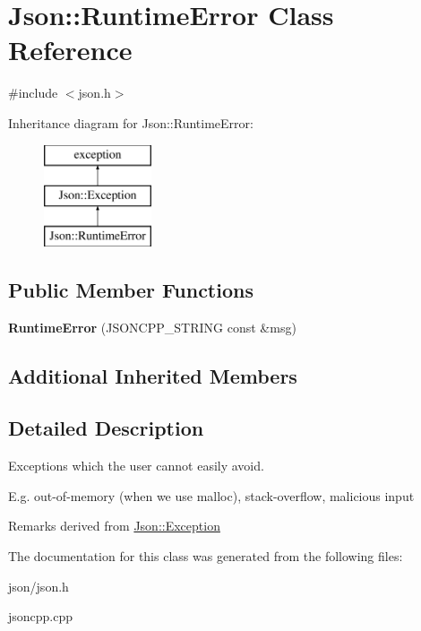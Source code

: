 \hypertarget{classJson_1_1RuntimeError}{}\section{Json\+:\+:Runtime\+Error Class Reference}
\label{classJson_1_1RuntimeError}


{\ttfamily \#include $<$json.\+h$>$}

Inheritance diagram for Json\+:\+:Runtime\+Error\+:\begin{figure}[H]
\begin{center}
\leavevmode
\includegraphics[height=3.000000cm]{classJson_1_1RuntimeError}
\end{center}
\end{figure}
\subsection*{Public Member Functions}
\begin{DoxyCompactItemize}
\item 
\mbox{\label{classJson_1_1RuntimeError_a0f6445dc345ce0a703610b6e893fee40}} 
{\bfseries Runtime\+Error} (J\+S\+O\+N\+C\+P\+P\+\_\+\+S\+T\+R\+I\+NG const \&msg)
\end{DoxyCompactItemize}
\subsection*{Additional Inherited Members}


\subsection{Detailed Description}
Exceptions which the user cannot easily avoid.

E.\+g. out-\/of-\/memory (when we use malloc), stack-\/overflow, malicious input

\begin{DoxyRemark}{Remarks}
derived from \hyperlink{classJson_1_1Exception}{Json\+::\+Exception} 
\end{DoxyRemark}


The documentation for this class was generated from the following files\+:\begin{DoxyCompactItemize}
\item 
json/json.\+h\item 
jsoncpp.\+cpp\end{DoxyCompactItemize}
